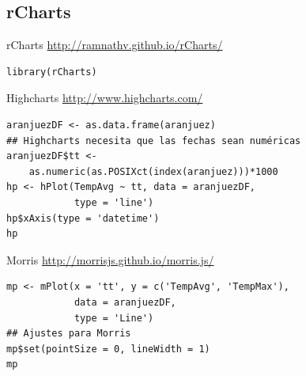 \documentclass[xcolor={usenames,svgnames,dvipsnames}]{beamer}
\begin{document}
\subsection{rCharts}
\label{sec-5-2}

\begin{frame}[fragile,label=sec-5-2-1]{rCharts}
 \url{http://ramnathv.github.io/rCharts/} 

\lstset{language=R,label= ,caption= ,numbers=none}
\begin{lstlisting}
library(rCharts)
\end{lstlisting}
\end{frame}

\begin{frame}[fragile,label=sec-5-2-2]{Highcharts}
 \url{http://www.highcharts.com/}

\lstset{language=R,label= ,caption= ,numbers=none}
\begin{lstlisting}
aranjuezDF <- as.data.frame(aranjuez)
## Highcharts necesita que las fechas sean numéricas
aranjuezDF$tt <-
    as.numeric(as.POSIXct(index(aranjuez)))*1000
hp <- hPlot(TempAvg ~ tt, data = aranjuezDF,
            type = 'line')
hp$xAxis(type = 'datetime')
hp
\end{lstlisting}
\end{frame}

\begin{frame}[fragile,label=sec-5-2-3]{Morris}
 \url{http://morrisjs.github.io/morris.js/}

\lstset{language=R,label= ,caption= ,numbers=none}
\begin{lstlisting}
mp <- mPlot(x = 'tt', y = c('TempAvg', 'TempMax'),
            data = aranjuezDF,
            type = 'Line')
## Ajustes para Morris            
mp$set(pointSize = 0, lineWidth = 1)
mp
\end{lstlisting}
\end{frame}

\begin{frame}[label=sec-5-2-4]{}

\end{frame}
\end{document}
